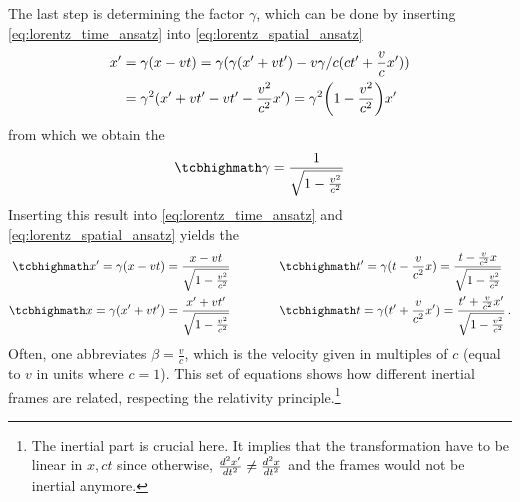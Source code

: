 The last step is determining the factor $\gamma$, which can be done by inserting \eqref{eq:lorentz_time_ansatz} into \eqref{eq:lorentz_spatial_ansatz}
\begin{align*}
x' &= \gamma (x - vt) = \gamma (\gamma (x' + vt') - v \gamma / c (ct' + \frac{v}{c} x'))
\\
&= \gamma^2 (x' + vt' - vt' - \frac{v^2}{c^2} x') = \gamma^2 \qty(1 - \frac{v^2}{c^2}) x'
\end{align*}
from which we obtain the 
\begin{equation}\label{eq:gamma_factor}
\eqbox{
\gamma = \frac{1}{\sqrt{1 - \frac{v^2}{c^2}}}
}
\end{equation}
Inserting this result into \eqref{eq:lorentz_time_ansatz} and \eqref{eq:lorentz_spatial_ansatz} yields the 
\begin{subequations}\label{eq:lorentz_trafo}
%
%
\begin{align}
\eqbox{
x' = \gamma (x - vt) = \frac{x - vt}{\sqrt{1 - \frac{v^2}{c^2}}}
}
\qquad & \qquad
\eqbox{
t' = \gamma (t - \frac{v}{c^2} x) = \frac{t - \frac{v}{c^2} x}{\sqrt{1 - \frac{v^2}{c^2}}}
}
\\
\eqbox{
x = \gamma (x' + vt') = \frac{x' + vt'}{\sqrt{1 - \frac{v^2}{c^2}}}
}
\qquad & \qquad
\eqbox{
t = \gamma (t' + \frac{v}{c^2} x') = \frac{t' + \frac{v}{c^2} x'}{\sqrt{1 - \frac{v^2}{c^2}}}
} \, .
\end{align}
\end{subequations}
Often, one abbreviates $\beta = \frac{v}{c}$, which is the velocity given in multiples of $c$ (equal to $v$ in units where $c = 1$). This set of equations shows how different inertial frames are related, respecting the relativity principle.\footnote{The inertial part is crucial here. It implies that the transformation have to be linear in $x, ct$ since otherwise, $\dv[2]{x'}{t} \neq \dv[2]{x}{t}$ and the frames would not be inertial anymore.}\\


